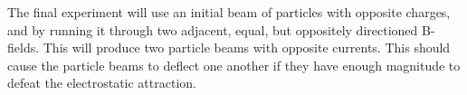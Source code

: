 \documentclass[12pt,letterpaper]{article}
\begin{document}
The final experiment will use an initial beam of particles with opposite charges, and by running it through two adjacent, equal, but oppositely directioned B-fields.
This will produce two particle beams with opposite currents. 
This should cause the particle beams to deflect one another if they have enough magnitude to defeat the electrostatic attraction.
\end{document}
